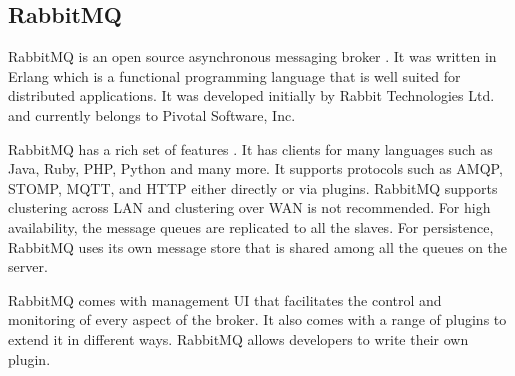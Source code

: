 \subsection{RabbitMQ}

RabbitMQ is an open source asynchronous messaging broker \parencite{richardson2008introduction}. It was written in Erlang which is a functional programming language that is well suited for distributed applications. It was developed initially by Rabbit Technologies Ltd. and currently belongs to Pivotal Software, Inc.

RabbitMQ has a rich set of features \parencite{rabbitmq_features}. It has clients for many languages such as Java, Ruby, PHP, Python and many more. It supports protocols such as AMQP, STOMP, MQTT, and HTTP either directly or via plugins. RabbitMQ supports clustering across LAN and clustering over WAN is not recommended. For high availability, the message queues are replicated to all the slaves. For persistence, RabbitMQ uses its own message store that is shared among all the queues on the server. 

RabbitMQ comes with management UI that facilitates the control and monitoring of every aspect of the broker. It also comes with a range of plugins to extend it in different ways. RabbitMQ allows developers to write their own plugin.
